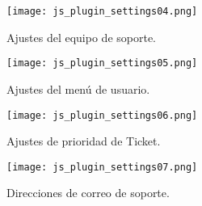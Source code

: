 \begin{figure}[H]
\centering
\texttt{[image: js\_plugin\_settings04.png]}
\caption{Ajustes del equipo de soporte.}
\label{fig:js:07}
\end{figure}
\begin{figure}[H]
\centering
\texttt{[image: js\_plugin\_settings05.png]}
\caption{Ajustes del menú de usuario.}
\label{fig:js:08}
\end{figure}
\begin{figure}[H]
\centering
\texttt{[image: js\_plugin\_settings06.png]}
\caption{Ajustes de prioridad de Ticket.}
\label{fig:js:09}
\end{figure}
\begin{figure}[H]
\centering
\texttt{[image: js\_plugin\_settings07.png]}
\caption{Direcciones de correo de soporte.}
\label{fig:js:10}
\end{figure}
